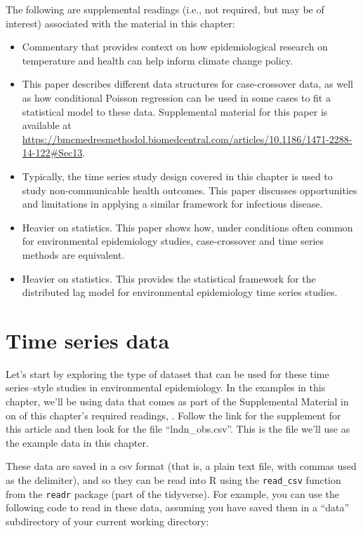 \documentclass[
]{book}
\providecommand{\tightlist}{%
  \setlength{\itemsep}{0pt}\setlength{\parskip}{0pt}}
\begin{document}
The following are supplemental readings (i.e., not required, but may be of
interest) associated with the material in this chapter:

\begin{itemize}
\tightlist
\item
  \citet{armstrong2012commentary} Commentary that provides context on how epidemiological
  research on temperature and health can help inform climate change policy.
\item
  \citet{armstrong2014conditional} This paper describes different data structures for
  case-crossover data, as well as how conditional Poisson regression can be used
  in some cases to fit a statistical model to these data.
  Supplemental material for this paper is available at
  \url{https://bmcmedresmethodol.biomedcentral.com/articles/10.1186/1471-2288-14-122\#Sec13}.
\item
  \citet{imai2015time} Typically, the time series study design covered in this
  chapter is used to study non-communicable health outcomes. This paper discusses
  opportunities and limitations in applying a similar framework for infectious
  disease.
\item
  \citet{lu2007equivalence} Heavier on statistics. This paper shows how, under
  conditions often common for environmental epidemiology studies, case-crossover
  and time series methods are equivalent.
\item
  \citet{gasparrini2014modeling} Heavier on statistics. This provides the statistical
  framework for the distributed lag model for environmental epidemiology time
  series studies.
\end{itemize}

\hypertarget{time-series-data}{%
\section{Time series data}\label{time-series-data}}

Let's start by exploring the type of dataset that can be used for these
time series--style studies in environmental epidemiology. In the examples
in this chapter, we'll be using data that comes as part of the Supplemental
Material in on of this chapter's required readings, \citet{vicedo2019hands} .
Follow the link for the supplement for this article and then look for the
file ``lndn\_obs.csv''. This is the file we'll use as the example data in this
chapter.

These data are saved in a csv format (that is, a plain text file, with commas
used as the delimiter), and so they can be read into R using the \texttt{read\_csv}
function from the \texttt{readr} package (part of the tidyverse). For example, you can
use the following code to read in these data, assuming you have saved them in a
``data'' subdirectory of your current working directory:
\end{document}
